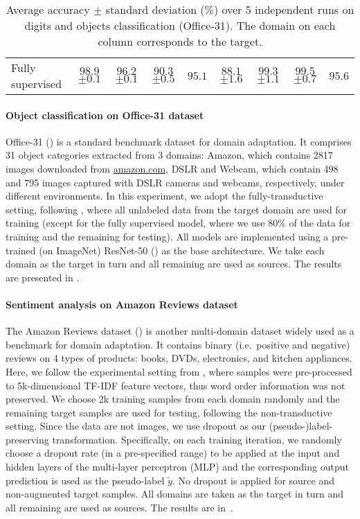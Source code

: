 \begin{table}
\begin{tabular}{l|ccc:c|ccc:c}
		Fully supervised            & $ 98.9 $ \tiny{$ \pm 0.1 $}  & $ 96.2 $ \tiny{$ \pm 0.1 $}   & $ 90.3 $ \tiny{$ \pm 0.5 $} & $95.1$ & $ 88.1 $ \tiny{$ \pm 1.6 $}   & $ 99.3 $ \tiny{$ \pm 1.1 $}       & $ 99.5 $ \tiny{$ \pm 0.7 $} & $95.6$
	\end{tabular}
	\caption{Average accuracy $\pm$ standard deviation (\%) over 5 independent runs on digits and objects classification (Office-31). The domain on each column corresponds to the target.}
	\label{tab:digits_office_acc}
\end{table}

\paragraph{Object classification on Office-31 dataset} Office-31 (\citet{Saenko2010}) is a standard benchmark dataset for domain adaptation. It comprises 31 object categories extracted from 3 domains: Amazon, which contains 2817 images downloaded from \url{amazon.com}, DSLR and Webcam, which contain 498 and 795 images captured with DSLR cameras and webcams, respectively, under different environments. In this experiment, we adopt the fully-transductive setting, following \citet{Pei2018}, where all unlabeled data from the target domain are used for training (except for the fully supervised model, where we use 80\% of the data for training and the remaining for testing). All models are implemented using a pre-trained (on ImageNet) ResNet-50 (\citet{He2016}) as the base architecture. We take each domain as the target in turn and all remaining are used as sources. The results are presented in .

\paragraph{Sentiment analysis on Amazon Reviews dataset} The Amazon Reviews dataset (\citet{Blitzer2007}) is another multi-domain dataset widely used as a benchmark for domain adaptation. It contains binary (i.e.\ positive and negative) reviews on 4 types of products: books, DVDs, electronics, and kitchen appliances. Here, we follow the experimental setting from \citet{Chen2012}, where samples were pre-processed to 5k-dimensional TF-IDF feature vectors, thus word order information was not preserved. We choose 2k training samples from each domain randomly and the remaining target samples are used for testing, following the non-transductive setting. Since the data are not images, we use dropout as our (pseudo-)label-preserving transformation. Specifically, on each training iteration, we randomly choose a dropout rate (in a pre-specified range) to be applied at the input and hidden layers of the multi-layer perceptron (MLP) and the corresponding output prediction is used as the pseudo-label $\tilde{y}$. No dropout is applied for source and non-augmented target samples. All domains are taken as the target in turn and all remaining are used as sources. The results are in~.

